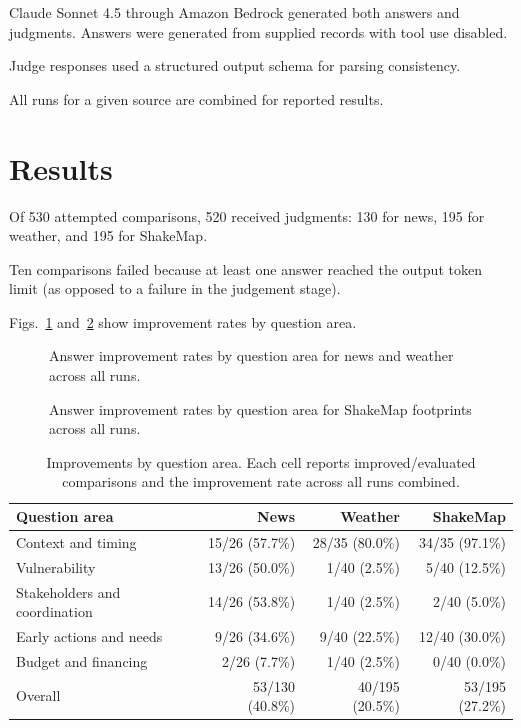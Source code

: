 \documentclass[journal]{IEEEtran}
\begin{document}
Claude Sonnet 4.5 through Amazon Bedrock generated both answers and judgments.
Answers were generated from supplied records with tool use disabled.

Judge responses used a structured output schema for parsing consistency.

All runs for a given source are combined for reported results.

\section{Results}

Of 530 attempted comparisons, 520 received judgments: 130 for news, 195 for weather,
and 195 for ShakeMap.

Ten comparisons failed because at least one answer reached the output token limit
(as opposed to a failure in the judgement stage).

Figs.~\ref{fig:gap-news-weather} and~\ref{fig:gap-shakemap} show improvement rates by question area.

\begin{figure}[!t]
    \centering
    
    \caption{Answer improvement rates by question area for news and weather across all runs.}
    \label{fig:gap-news-weather}
\end{figure}

\begin{figure}[!t]
    \centering
    
    \caption{Answer improvement rates by question area for ShakeMap footprints across all runs.}
    \label{fig:gap-shakemap}
\end{figure}

\begin{table}[!t]
\centering
\caption{Improvements by question area. Each cell reports improved/evaluated comparisons
and the improvement rate across all runs combined.}
\label{tab:gap-results}
\small
\begin{tabular}{lrrr}
\hline
Question area & News & Weather & ShakeMap \\
\hline
Context and timing & 15/26 (57.7\%) & 28/35 (80.0\%) & 34/35 (97.1\%) \\
Vulnerability & 13/26 (50.0\%) & 1/40 (2.5\%) & 5/40 (12.5\%) \\
Stakeholders and coordination & 14/26 (53.8\%) & 1/40 (2.5\%) & 2/40 (5.0\%) \\
Early actions and needs & 9/26 (34.6\%) & 9/40 (22.5\%) & 12/40 (30.0\%) \\
Budget and financing & 2/26 (7.7\%) & 1/40 (2.5\%) & 0/40 (0.0\%) \\
\hline
Overall & 53/130 (40.8\%) & 40/195 (20.5\%) & 53/195 (27.2\%) \\
\hline
\end{tabular}
\end{table}
\end{document}
